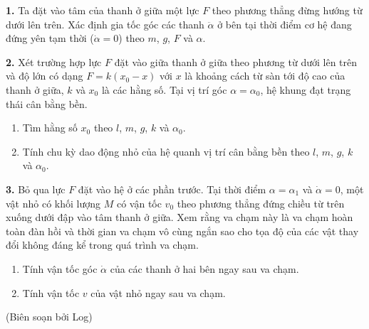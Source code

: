 \begin{center}
\begin{minipage}{0.4\textwidth}
\end{minipage}    
\end{center}

\noindent \textbf{1.} Ta đặt vào tâm của thanh ở giữa một lực $F$ theo phương thẳng đừng hướng từ dưới lên trên. Xác định gia tốc góc các thanh $\ddot{\alpha}$ ở bên tại thời điểm cơ hệ đang đứng yên tạm thời ($\dot{\alpha}=0$) theo $m$, $g$, $F$ và $\alpha$. 

\noindent \textbf{2.} Xét trường hợp lực $F$ đặt vào giữa thanh ở giữa theo phương từ dưới lên trên và độ lớn có dạng $F=k(x_0-x)$ với $x$ là khoảng cách từ sàn tới độ cao của thanh ở giữa, $k$ và $x_0$ là các hằng số. Tại vị trí góc $\alpha=\alpha_0$, hệ khung đạt trạng thái cân bằng bền.
\begin{enumerate}[label=\textbf{\alph*,}]\itemsep0em
    \item Tìm hằng số $x_0$ theo $l$, $m$, $g$, $k$ và $\alpha_0$.
    \item Tính chu kỳ dao động nhỏ của hệ quanh vị trí cân bằng bền theo $l$, $m$, $g$, $k$ và $\alpha_0$.
\end{enumerate}
\noindent \textbf{3.} Bỏ qua lực $F$ đặt vào hệ ở các phần trước. Tại thời điểm $\alpha=\alpha_1$ và $\dot{\alpha}=0$, một vật nhỏ có khối lượng $M$ có vận tốc $v_0$ theo phương thẳng đứng chiều từ trên xuống dưới đập vào tâm thanh ở giữa. Xem rằng va chạm này là va chạm hoàn toàn đàn hồi và thời gian va chạm vô cùng ngắn sao cho tọa độ của các vật thay đổi không đáng kể trong quá trình va chạm.
\begin{enumerate}[label=\textbf{\alph*,}]\itemsep0em
    \item Tính vận tốc góc $\dot{\alpha}$ của các thanh ở hai bên ngay sau va chạm.
    \item Tính vận tốc $v$ của vật nhỏ ngay sau va chạm.
\end{enumerate}

\begin{flushright}
    (Biên soạn bởi Log)
\end{flushright}